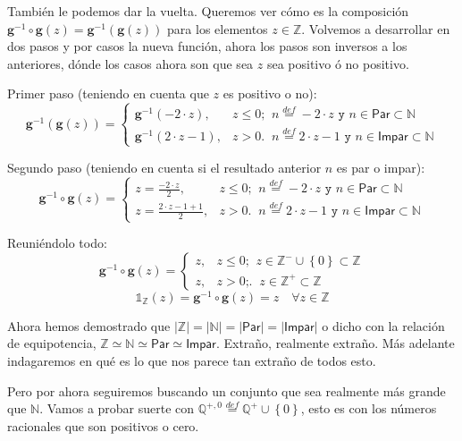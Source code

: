 \documentclass{amsart}
\theoremstyle{definition}
\theoremstyle{remark}
\numberwithin{equation}{section}
\newcommand{\abs}[1]{\left\lvert#1\right\rvert}
\newcommand{\set}[1]{\left\lbrace{#1}\right\rbrace}
\newcommand{\setN}{\mathds N}
\newcommand{\setZ}{\mathds Z}
\newcommand{\setQ}{\mathds Q}
\newcommand{\card}[1]{\abs{#1}}
\newcommand{\monrel}[1]{\mathbf{#1}}
\newcommand{\funct}[1]{\monrel{#1}}
\newcommand{\functinv}[1]{{\funct{#1}}^{-1}}
\newcommand{\functat}[2]{\funct{#1}{\left({#2}\right)}}
\newcommand{\functinvat}[2]{\functinv{#1}{\left({#2}\right)}}
\newcommand{\defin}{\overset {def}{=}}
\begin{document}
	También le podemos dar la vuelta. Queremos ver cómo es la composición 
$\functinv{g}\circ\functat{g}{z} = \functinvat{g}{\functat{g}{z}}$ para los 
elementos $z \in \setZ$.  Volvemos a desarrollar en dos pasos y por casos la 
nueva función, ahora los pasos son inversos a los anteriores, dónde los casos 
ahora son que sea $z$ sea positivo ó no positivo.




Primer paso (teniendo en cuenta que $z$ es positivo o no):
$$
\functinvat{g}{\functat{g}{z}} =
\left\{
  \begin{array}{ll}
    \functinvat{g}{-2 \cdot z} , & z \leq 0 \text{;}\;\;{ n \defin -2\cdot z} 
    \texttt{ y } {n \in \textsf{Par} \subset \setN}\\
    \functinvat{g}{2 \cdot z - 1}, & z > 0 \text{.}\;\;{ n \defin 2\cdot z - 
    1} \texttt{ y } {n \in \textsf{Impar} \subset \setN}
  \end{array}
\right.
$$


Segundo paso (teniendo en cuenta si el resultado anterior $n$ es par o 
impar):
$$
\functinv{g}\circ\funct{g}\left({z}\right) =
\left\{
  \begin{array}{ll}
    z = \frac{-2 \cdot z}{2} , & z \leq 0 \text{;}\;\;{ n \defin -2\cdot z} 
    \texttt{ y } {n \in \textsf{Par} \subset \setN}\\
    z = \frac{{2 \cdot z - 1} + 1}{2} , & z > 0 \text{.}\;\;{ n \defin 2\cdot 
    z - 1} \texttt{ y } {n \in \textsf{Impar} \subset \setN}
  \end{array}
\right.
$$


Reuniéndolo todo:
$$
\functinv{g}\circ\funct{g}\left({z}\right) =
\left\{
  \begin{array}{ll}
    z , & z \leq 0 \text{;}\;\;{z \in \setZ^{-}\cup\set{0} \subset \setZ}\\
    z , & z > 0 \text{;}\text{.}\;\;{z \in \setZ^{+} \subset \setZ}
  \end{array}
\right.
$$
$$
{{\mathds{1}}_{\setZ}{\left({z}\right)}=
\functinv{g}\circ\funct{g}}{\left({z}\right)} = z\quad \forall z \in \setZ
$$


	Ahora hemos demostrado que $\card{\setZ} = \card{\setN} = 
\card{\textsf{Par}} = \card{\textsf{Impar}}$ o dicho con la relación de 
equipotencia, $\setZ \simeq \setN \simeq \textsf{Par} \simeq \textsf{Impar}$. 
Extraño, realmente extraño. Más adelante indagaremos en qué es lo que nos 
parece tan extraño de todos esto.


	Pero por ahora seguiremos buscando un conjunto que sea realmente más 
grande que $\setN$. Vamos a probar suerte con $\setQ^{+,0} \defin \setQ^+ 
\cup \set{0}$, esto es con los números racionales que son positivos o cero.
\end{document}
